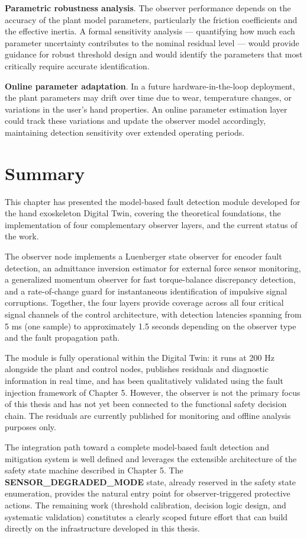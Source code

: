 \textbf{Parametric robustness analysis}. The observer performance depends on the accuracy of the plant model parameters, particularly the friction coefficients and the effective inertia. A formal sensitivity analysis — quantifying how much each parameter uncertainty contributes to the nominal residual level — would provide guidance for robust threshold design and would identify the parameters that most critically require accurate identification.

\textbf{Online parameter adaptation}. In a future hardware-in-the-loop deployment, the plant parameters may drift over time due to wear, temperature changes, or variations in the user's hand properties. An online parameter estimation layer could track these variations and update the observer model accordingly, maintaining detection sensitivity over extended operating periods.

\section{Summary}
This chapter has presented the model-based fault detection module developed for the hand exoskeleton Digital Twin, covering the theoretical foundations, the implementation of four complementary observer layers, and the current status of the work.

The observer node implements a Luenberger state observer for encoder fault detection, an admittance inversion estimator for external force sensor monitoring, a generalized momentum observer for fast torque-balance discrepancy detection, and a rate-of-change guard for instantaneous identification of impulsive signal corruptions. Together, the four layers provide coverage across all four critical signal channels of the control architecture, with detection latencies spanning from 5 ms (one sample) to approximately 1.5 seconds depending on the observer type and the fault propagation path.

The module is fully operational within the Digital Twin: it runs at 200 Hz alongside the plant and control nodes, publishes residuals and diagnostic information in real time, and has been qualitatively validated using the fault injection framework of Chapter 5. However, the observer is not the primary focus of this thesis and has not yet been connected to the functional safety decision chain. The residuals are currently published for monitoring and offline analysis purposes only.

The integration path toward a complete model-based fault detection and mitigation system is well defined and leverages the extensible architecture of the safety state machine described in Chapter 5. The \textbf{SENSOR\_DEGRADED\_MODE} state, already reserved in the safety state enumeration, provides the natural entry point for observer-triggered protective actions. The remaining work (threshold calibration, decision logic design, and systematic validation) constitutes a clearly scoped future effort that can build directly on the infrastructure developed in this thesis.